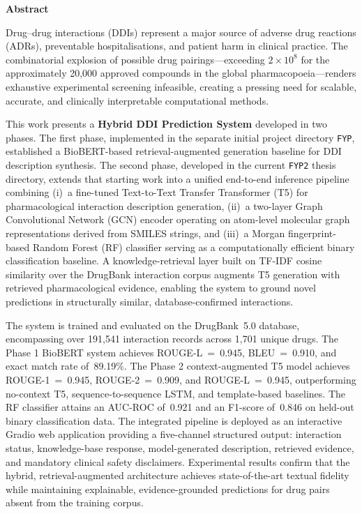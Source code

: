 \documentclass[12pt,a4paper,oneside]{report}
\begin{document}
\setcounter{page}{1}

\newpage
\begin{center}
{\Large\bfseries Abstract}
\end{center}
\vspace{0.5cm}

Drug--drug interactions (DDIs) represent a major source of adverse drug reactions (ADRs),
preventable hospitalisations, and patient harm in clinical practice. The combinatorial
explosion of possible drug pairings---exceeding $2 \times 10^8$ for the approximately
20,000 approved compounds in the global pharmacopoeia---renders exhaustive experimental
screening infeasible, creating a pressing need for scalable, accurate, and clinically
interpretable computational methods.

This work presents a \textbf{Hybrid DDI Prediction System} developed in two phases. The first phase, implemented in the separate initial project directory \texttt{FYP}, established a BioBERT-based retrieval-augmented generation baseline for DDI description synthesis. The second phase, developed in the current \texttt{FYP2} thesis directory, extends that starting work into a unified end-to-end inference pipeline combining (i)~a fine-tuned Text-to-Text Transfer Transformer (T5) for pharmacological interaction description generation, (ii)~a two-layer Graph Convolutional Network (GCN) encoder operating on atom-level molecular graph representations derived from SMILES strings, and (iii)~a Morgan fingerprint-based Random Forest (RF) classifier serving as a computationally efficient binary classification baseline. A knowledge-retrieval layer built on TF-IDF cosine similarity over the DrugBank interaction corpus augments T5 generation with retrieved pharmacological evidence, enabling the system to ground novel predictions in structurally similar, database-confirmed interactions.

The system is trained and evaluated on the DrugBank~5.0 database, encompassing over 191,541
interaction records across 1,701 unique drugs. The Phase 1 BioBERT system achieves
ROUGE-L~=~0.945, BLEU~=~0.910, and exact match rate of~89.19\%. The Phase 2 context-augmented T5 model achieves
ROUGE-1~=~0.945, ROUGE-2~=~0.909, and ROUGE-L~=~0.945, outperforming no-context T5,
sequence-to-sequence LSTM, and template-based baselines. The RF classifier attains an
AUC-ROC of~0.921 and an F1-score of~0.846 on held-out binary classification data.
The integrated pipeline is deployed as an interactive Gradio web application providing a
five-channel structured output: interaction status, knowledge-base response, model-generated
description, retrieved evidence, and mandatory clinical safety disclaimers. Experimental
results confirm that the hybrid, retrieval-augmented architecture achieves state-of-the-art
textual fidelity while maintaining explainable, evidence-grounded predictions for drug pairs
absent from the training corpus.
\end{document}
